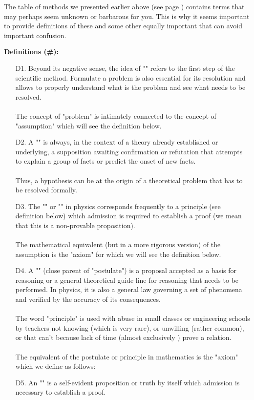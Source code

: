 The table of methods we presented earlier above (see page \pageref{methodology table}) contains terms that may perhaps seem unknown or barbarous for you. This is why it seems important to provide definitions of these and some other equally important that can avoid important confusion. 

\textbf{Definitions (\#\mydef):}

\begin{itemize}
	\item[D1.] Beyond its negative sense, the idea of "" refers to the first step of the scientific method. Formulate a problem is also essential for its resolution and allows to properly understand what is the problem and see what needs to be resolved. \\\\
	The concept of "problem" is intimately connected to the concept of "assumption" which will see the definition below. 

	\item[D2.] A "" is always, in the context of a theory already established or underlying, a supposition awaiting confirmation or refutation that attempts to explain a group of facts or predict the onset of new facts.\\\\
	Thus, a hypothesis can be at the origin of a theoretical problem that has to be resolved formally. 

	\item[D3.] The "" or  "" in physics corresponds frequently to a principle (see definition below) which admission is required to establish a proof (we mean that this is a non-provable proposition).\\\\
	The mathematical equivalent (but in a more rigorous version) of the assumption is the "axiom" for which we will see the definition below. 

	\item[D4.] A "" (close parent of "postulate") is a proposal accepted as a basis for reasoning or a general theoretical guide line for reasoning that needs to be performed. In physics, it is also a general law governing a set of phenomena and verified by the accuracy of its consequences. \\\\
The word "principle" is used with abuse in small classes or engineering schools by teachers not knowing (which is very rare), or unwilling (rather common), or that can't because lack of time (almost exclusively ) prove a relation.\\\\
The equivalent of the postulate or principle in mathematics is the "axiom" which we define as follows: 

	\item[D5.] An "" is a self-evident proposition or truth by itself which admission is necessary to establish a proof.\label{axiom} 
\end{itemize}

